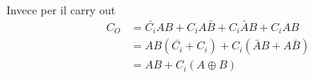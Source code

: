 \documentclass[a4paper,11pt]{article}
\begin{document}
	
	Invece per il carry out
	\begin{equation}
		\begin{aligned}
			C_O &= \bar{C_i}AB + C_iA\bar{B} + C_i\bar{A}B + C_iAB \\
			&= AB(\bar{C_i} + C_i) + C_i(\bar{A}B + A\bar{B}) \\
			&= AB + C_i(A \oplus B)
		\end{aligned}
	\end{equation}
	
	
	
	\medskip
	
	\printbibliography
	
\end{document}
